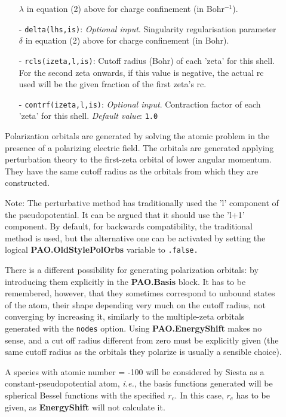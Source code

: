 \documentclass[11pt]{article}
\begin{document}
\begin{description}
\begin{itemize}
$\lambda$ in equation (2) above for charge confinement (in Bohr$^{-1}$).
\item[-] {\tt delta(lhs,is)}: {\it Optional input}. Singularity regularisation parameter
$\delta$ in equation (2) above for charge confinement (in Bohr).
\item[-] {\tt rcls(izeta,l,is)}: Cutoff radius (Bohr) of
each 'zeta' for this shell. For the second zeta onwards, if this value
is negative, the actual rc used will be the given fraction of the
first zeta's rc.
\item[-] {\tt contrf(izeta,l,is)}: {\it Optional input}.
Contraction factor of
each 'zeta' for this shell.
{\it Default value}: {\tt 1.0}
\end{itemize}

Polarization orbitals are generated by solving the
atomic problem in the presence of a polarizing electric field. The
orbitals are generated applying perturbation theory to the first-zeta
orbital of lower angular momentum.  They have the same cutoff radius
as the orbitals from which they are constructed.

Note: The perturbative method has traditionally used the 'l' component
of the pseudopotential. It can be argued that it should use the 'l+1'
component. By default, for backwards compatibility, the traditional
method is used, but the alternative one can be activated by setting
the logical {\bf PAO.OldStylePolOrbs} variable to {\tt .false.}

There is a different possibility for generating polarization orbitals:
by introducing them explicitly in the {\bf PAO.Basis} block.
It has to be remembered, however, that they sometimes correspond to
unbound states of the atom, their shape depending very much on the
cutoff radius, not converging by increasing it, similarly to the
multiple-zeta orbitals generated with the {\tt nodes} option.
Using {\bf PAO.EnergyShift} makes no sense, and a cut off
radius different from zero must be explicitly given (the same cutoff radius
as the orbitals they polarize is usually a sensible choice).

A species with atomic number = -100 will be considered by {\sc Siesta} as
a constant-pseudopotential atom, {\it i.e.}, the basis functions
generated will be spherical Bessel functions
with the specified $r_c$. In this case, $r_c$ has to be given, as
{\bf EnergyShift} will not calculate it.


\end{description}
\end{document}
